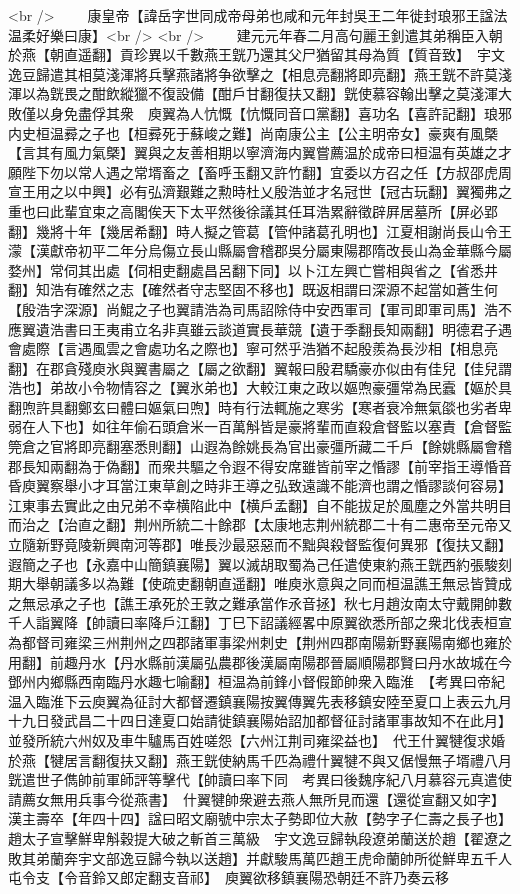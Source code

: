 <br />
　　康皇帝【諱岳字世同成帝母弟也咸和元年封吳王二年徙封琅邪王諡法温柔好樂曰康】<br />
<br />
　　建元元年春二月高句麗王釗遣其弟稱臣入朝於燕【朝直遥翻】貢珍異以千數燕王皝乃還其父尸猶留其母為質【質音致】　宇文逸豆歸遣其相莫淺渾將兵擊燕諸將争欲擊之【相息亮翻將即亮翻】燕王皝不許莫淺渾以為皝畏之酣飲縱獵不復設備【酣戶甘翻復扶又翻】皝使慕容翰出擊之莫淺渾大敗僅以身免盡俘其衆　庾翼為人忼慨【忼慨同音口黨翻】喜功名【喜許記翻】琅邪内史桓温彛之子也【桓彛死于蘇峻之難】尚南康公主【公主明帝女】豪爽有風槩【言其有風力氣槩】翼與之友善相期以寧濟海内翼嘗薦温於成帝曰桓温有英雄之才願陛下勿以常人遇之常壻畜之【畜呼玉翻又許竹翻】宜委以方召之任【方叔邵虎周宣王用之以中興】必有弘濟艱難之勲時杜乂殷浩並才名冠世【冠古玩翻】翼獨弗之重也曰此輩宜束之高閣俟天下太平然後徐議其任耳浩累辭徵辟屛居墓所【屏必郢翻】幾將十年【幾居希翻】時人擬之管葛【管仲諸葛孔明也】江夏相謝尚長山令王濛【漢獻帝初平二年分烏傷立長山縣屬會稽郡吳分屬東陽郡隋改長山為金華縣今屬婺州】常伺其出處【伺相吏翻處昌呂翻下同】以卜江左興亡嘗相與省之【省悉井翻】知浩有確然之志【確然者守志堅固不移也】既返相謂曰深源不起當如蒼生何【殷浩字深源】尚鯤之子也翼請浩為司馬詔除侍中安西軍司【軍司即軍司馬】浩不應翼遺浩書曰王夷甫立名非真雖云談道實長華競【遺于季翻長知兩翻】明德君子遇會處際【言遇風雲之會處功名之際也】寧可然乎浩猶不起殷羨為長沙相【相息亮翻】在郡貪殘庾氷與翼書屬之【屬之欲翻】翼報曰殷君驕豪亦似由有佳兒【佳兒謂浩也】弟故小令物情容之【翼氷弟也】大較江東之政以嫗喣豪彊常為民蠧【嫗於具翻喣許具翻鄭玄曰體曰嫗氣曰喣】時有行法輒施之寒劣【寒者衰冷無氣燄也劣者卑弱在人下也】如往年偷石頭倉米一百萬斛皆是豪將輩而直殺倉督監以塞責【倉督監筦倉之官將即亮翻塞悉則翻】山遐為餘姚長為官出豪彊所藏二千戶【餘姚縣屬會稽郡長知兩翻為于偽翻】而衆共驅之令遐不得安席雖皆前宰之惛謬【前宰指王導惛音昏庾翼察舉小才耳當江東草創之時非王導之弘致遠識不能濟也謂之惛謬談何容易】江東事去實此之由兄弟不幸横陷此中【横戶孟翻】自不能拔足於風塵之外當共明目而治之【治直之翻】荆州所統二十餘郡【太康地志荆州統郡二十有二惠帝至元帝又立隨新野竟陵新興南河等郡】唯長沙最惡惡而不黜與殺督監復何異邪【復扶又翻】遐簡之子也【永嘉中山簡鎮襄陽】翼以滅胡取蜀為己任遣使東約燕王皝西約張駿刻期大舉朝議多以為難【使疏吏翻朝直遥翻】唯庾氷意與之同而桓温譙王無忌皆贊成之無忌承之子也【譙王承死於王敦之難承當作氶音拯】秋七月趙汝南太守戴開帥數千人詣翼降【帥讀曰率降戶江翻】丁巳下詔議經畧中原翼欲悉所部之衆北伐表桓宣為都督司雍梁三州荆州之四郡諸軍事梁州刺史【荆州四郡南陽新野襄陽南鄉也雍於用翻】前趣丹水【丹水縣前漢屬弘農郡後漢屬南陽郡晉屬順陽郡賢曰丹水故城在今鄧州内鄉縣西南臨丹水趣七喻翻】桓温為前鋒小督假節帥衆入臨淮　【考異曰帝紀温入臨淮下云庾翼為征討大都督遷鎮襄陽按翼傳翼先表移鎮安陸至夏口上表云九月十九日發武昌二十四日達夏口始請徙鎮襄陽始詔加都督征討諸軍事故知不在此月】並發所統六州奴及車牛驢馬百姓嗟怨【六州江荆司雍梁益也】　代王什翼犍復求婚於燕【犍居言翻復扶又翻】燕王皝使納馬千匹為禮什翼犍不與又倨慢無子壻禮八月皝遣世子儁帥前軍師評等擊代【帥讀曰率下同　考異曰後魏序紀八月慕容元真遣使請薦女無用兵事今從燕書】　什翼犍帥衆避去燕人無所見而還【還從宣翻又如字】　漢主壽卒【年四十四】諡曰昭文廟號中宗太子勢即位大赦【勢字子仁壽之長子也】　趙太子宣擊鮮卑斛穀提大破之斬首三萬級　宇文逸豆歸執段遼弟蘭送於趙【翟遼之敗其弟蘭奔宇文部逸豆歸今執以送趙】并獻駿馬萬匹趙王虎命蘭帥所從鮮卑五千人屯令支【令音鈴又郎定翻支音祁】　庾翼欲移鎮襄陽恐朝廷不許乃奏云移